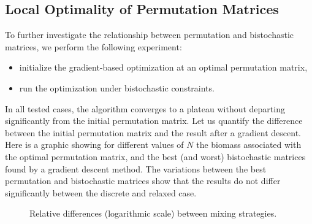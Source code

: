 \documentclass{article}
\begin{document}
\subsection{Local Optimality of Permutation Matrices}

To further investigate the relationship between permutation and bistochastic matrices, 
we perform the following experiment:

\begin{itemize}
    \item initialize the gradient-based optimization at an optimal permutation matrix,
    \item run the optimization under bistochastic constraints.
\end{itemize}

In all tested cases, the algorithm converges to a plateau without departing 
significantly from the initial permutation matrix.
Let us quantify the difference between the initial permutation matrix and the result after a gradient descent. 
Here is a graphic showing for different values of $N$ the biomass associated with the optimal permutation matrix, and the best (and worst) bistochastic matrices
found by a gradient descent method. The variations between the best permutation and bistochastic matrices show that the results do not differ significantly between the discrete and relaxed case.

\begin{figure}[H]
\centering
{}
\caption{
Relative differences (logarithmic scale) between mixing strategies.}
\end{figure}
\end{document}
